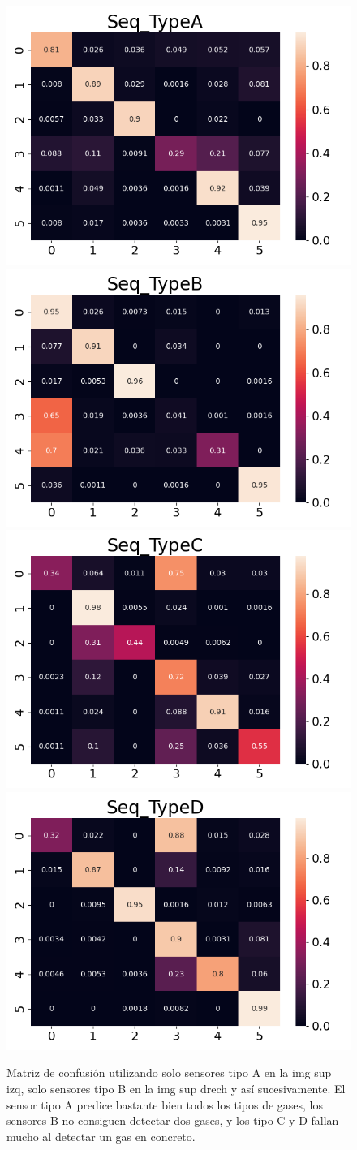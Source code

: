 \begin{figure}
	\centering
	\includegraphics[width=0.45\linewidth]{../py_imgs/Conf_Seq_TypeA}
	\includegraphics[width=0.45\linewidth]{../py_imgs/Conf_Seq_TypeB}
	\includegraphics[width=0.45\linewidth]{../py_imgs/Conf_Seq_TypeC}
	\includegraphics[width=0.45\linewidth]{../py_imgs/Conf_Seq_TypeD}
	\caption[Matrix de confusión para cada tipología de sensor]{ Matriz de confusión utilizando solo sensores tipo A en la img sup izq, solo sensores tipo B en la img sup drech y así sucesivamente. El sensor tipo A predice bastante bien todos los tipos de gases, los sensores B no consiguen detectar dos gases, y los tipo C y D fallan mucho al detectar un gas en concreto.   }
	\label{fig:confseqtypea}
\end{figure}

